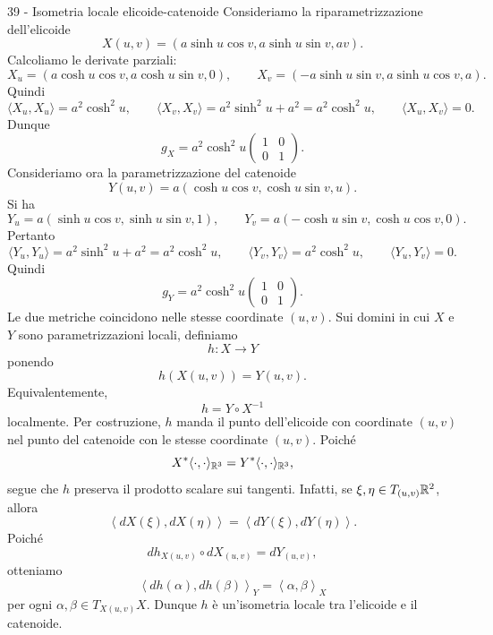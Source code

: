 \documentclass[a4paper]{article}
\begin{document}
\begin{snippetsolution}{39 - Isometria locale elicoide-catenoide}
    Consideriamo la riparametrizzazione dell'elicoide
    \[
        X(u,v)=
        \left(
            a\sinh u\cos v,
            a\sinh u\sin v,
            av
        \right).
    \]
    Calcoliamo le derivate parziali:
    \[
        X_u=
        \left(
            a\cosh u\cos v,
            a\cosh u\sin v,
            0
        \right),
        \qquad
        X_v=
        \left(
            -a\sinh u\sin v,
            a\sinh u\cos v,
            a
        \right).
    \]
    Quindi
    \[
        \langle X_u,X_u\rangle=a^2\cosh^2u,
        \qquad
        \langle X_v,X_v\rangle=a^2\sinh^2u+a^2=a^2\cosh^2u,
        \qquad
        \langle X_u,X_v\rangle=0.
    \]
    Dunque
    \[
        g_X=
        a^2\cosh^2u
        \begin{pmatrix}
            1 & 0\\
            0 & 1
        \end{pmatrix}.
    \]
    Consideriamo ora la parametrizzazione del catenoide
    \[
        Y(u,v)=
        a\left(
            \cosh u\cos v,
            \cosh u\sin v,
            u
        \right).
    \]
    Si ha
    \[
        Y_u=
        a\left(
            \sinh u\cos v,
            \sinh u\sin v,
            1
        \right),
        \qquad
        Y_v=
        a\left(
            -\cosh u\sin v,
            \cosh u\cos v,
            0
        \right).
    \]
    Pertanto
    \[
        \langle Y_u,Y_u\rangle=a^2\sinh^2u+a^2=a^2\cosh^2u,
        \qquad
        \langle Y_v,Y_v\rangle=a^2\cosh^2u,
        \qquad
        \langle Y_u,Y_v\rangle=0.
    \]
    Quindi
    \[
        g_Y=
        a^2\cosh^2u
        \begin{pmatrix}
            1 & 0\\
            0 & 1
        \end{pmatrix}.
    \]
    Le due metriche coincidono nelle stesse coordinate \((u,v)\). Sui domini in cui \(X\) e \(Y\) sono parametrizzazioni locali, definiamo
    \[
        h\colon X\to Y
    \]
    ponendo
    \[
        h(X(u,v))=Y(u,v).
    \]
    Equivalentemente,
    \[
        h=Y\circ X^{-1}
    \]
    localmente. Per costruzione, \(h\) manda il punto dell'elicoide con coordinate \((u,v)\) nel punto del catenoide con le stesse coordinate \((u,v)\).
    Poiché
    \[
        X^*\langle\cdot,\cdot\rangle_{\mathbb{R}^3}
        =
        Y^*\langle\cdot,\cdot\rangle_{\mathbb{R}^3},
    \]
    segue che \(h\) preserva il prodotto scalare sui tangenti. Infatti, se \(\xi,\eta\in T_{(u,v)}\mathbb{R}^2\), allora
    \[
        \left\langle dX(\xi),dX(\eta)\right\rangle
        =
        \left\langle dY(\xi),dY(\eta)\right\rangle.
    \]
    Poiché
    \[
        dh_{X(u,v)}\circ dX_{(u,v)}=dY_{(u,v)},
    \]
    otteniamo
    \[
        \left\langle dh(\alpha),dh(\beta)\right\rangle_Y
        =
        \left\langle \alpha,\beta\right\rangle_X
    \]
    per ogni \(\alpha,\beta\in T_{X(u,v)}X\). Dunque \(h\) è un'isometria locale tra l'elicoide e il catenoide.
\end{snippetsolution}
\end{document}
